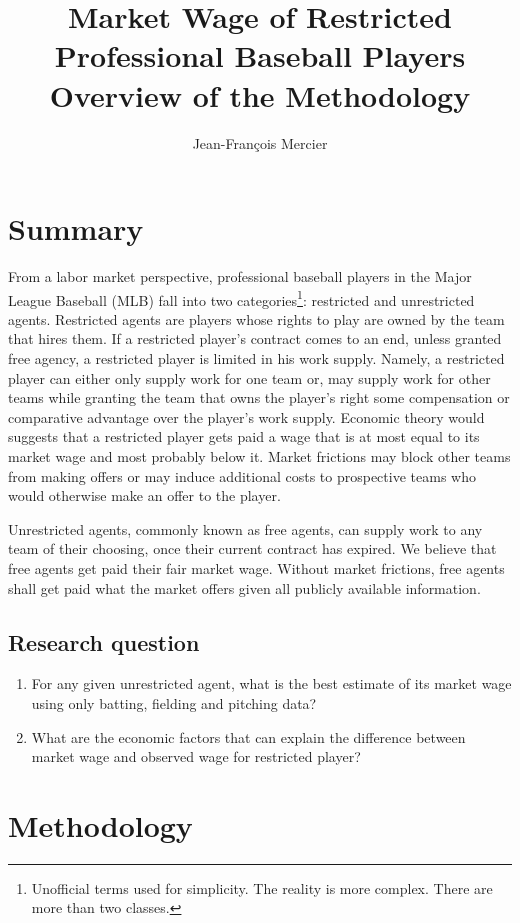 \documentclass[12pt,a4paper]{article}
\author{Jean-François Mercier}
\title{Market Wage of Restricted Professional Baseball Players \\ Overview of the Methodology}
\begin{document}
\maketitle

\section{Summary}

From a labor market perspective, professional baseball players in the Major League Baseball (MLB) fall into two categories\footnote{Unofficial terms used for simplicity. The reality is more complex. There are more than two classes.}: restricted and unrestricted agents. Restricted agents are players whose rights to play are owned by the team that hires them. If a restricted player's contract comes to an end, unless granted free agency, a restricted player is limited in his work supply. Namely, a restricted player can either only supply work for one team or, may supply work for other teams while granting the team that owns the player's right  some compensation or comparative advantage over the player's work supply. Economic theory would suggests that a restricted player gets paid a wage that is at most equal to its market wage and most probably below it. Market frictions may block other teams from making offers or may induce additional costs to prospective teams who would otherwise make an offer to the player. 

Unrestricted agents, commonly known as free agents, can supply work to any team of their choosing, once their current contract has expired. We believe that free agents get paid their fair market wage. Without market frictions, free agents shall get paid what the market offers given all publicly available information.  

\subsection{Research question}
\begin{enumerate}
	\item For any given unrestricted agent, what is the best estimate of its market wage using only batting, fielding and pitching data?
	\item What are the economic factors that can explain the difference between market wage and observed wage for restricted player?
\end{enumerate}

\section{Methodology}
\end{document}
